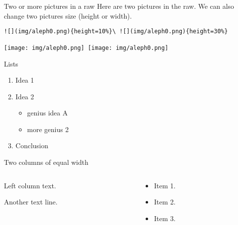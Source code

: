 \documentclass[
  11pt,
  ignorenonframetext,
  aspectratio=169,
  aspectratio=169]{beamer}
\providecommand{\tightlist}{%
  \setlength{\itemsep}{0pt}\setlength{\parskip}{0pt}}
\begin{document}
\begin{frame}[fragile]{Two or more pictures in a raw}
\label{two-or-more-pictures-in-a-raw}
Here are two pictures in the raw. We can also change two pictures size
(height or width).

\begin{lstlisting}
![](img/aleph0.png){height=10%}\ ![](img/aleph0.png){height=30%} 
\end{lstlisting}

\texttt{[image: img/aleph0.png]}~\texttt{[image: img/aleph0.png]}
\end{frame}

\begin{frame}{Lists}
\label{lists}
\begin{enumerate}
\tightlist
\item
  Idea 1
\item
  Idea 2

  \begin{itemize}
  \tightlist
  \item
    genius idea A
  \item
    more genius 2
  \end{itemize}
\item
  Conclusion
\end{enumerate}
\end{frame}

\begin{frame}{Two columns of equal width}
\label{two-columns-of-equal-width}
\begin{columns}[T]
\begin{column}{0.48\textwidth}
Left column text.

Another text line.
\end{column}

\begin{column}{0.48\textwidth}
\begin{itemize}
\tightlist
\item
  Item 1.
\item
  Item 2.
\item
  Item 3.
\end{itemize}
\end{column}
\end{columns}
\end{frame}
\end{document}
